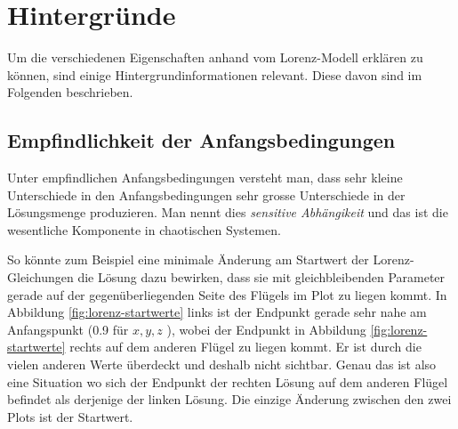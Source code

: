 
\section{Hintergründe}\label{backgroundinfo}
Um die verschiedenen Eigenschaften anhand vom Lorenz-Modell erklären zu können, sind einige Hintergrundinformationen relevant. Diese davon sind im Folgenden beschrieben.

\subsection{Empfindlichkeit der Anfangsbedingungen}
Unter empfindlichen Anfangsbedingungen versteht man, dass sehr kleine Unterschiede in den Anfangsbedingungen sehr grosse Unterschiede in der Lösungsmenge produzieren. Man nennt dies \textit{sensitive Abhängikeit} und das ist die wesentliche Komponente in chaotischen Systemen. 

So könnte zum Beispiel eine minimale Änderung am Startwert der Lorenz-Gleichungen die Lösung dazu bewirken, dass sie mit gleichbleibenden Parameter gerade auf der gegenüberliegenden Seite des Flügels im Plot zu liegen kommt. In Abbildung \ref{fig:lorenz-startwerte} links ist der Endpunkt gerade sehr nahe am Anfangspunkt (0.9 für $ x, y, z $ ), wobei der Endpunkt in Abbildung \ref{fig:lorenz-startwerte} rechts auf dem anderen Flügel zu liegen kommt. Er ist durch die vielen anderen Werte überdeckt und deshalb nicht sichtbar. Genau das ist also eine Situation wo sich der Endpunkt der rechten Lösung auf dem anderen Flügel befindet als derjenige der linken Lösung. Die einzige Änderung zwischen den zwei Plots ist der Startwert.

